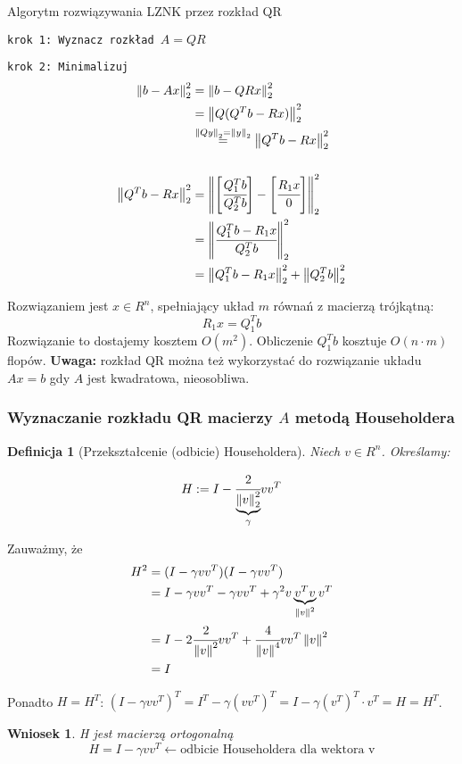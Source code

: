 \documentclass[hidelinks,a4paper,fleqn,oneside]{book}
\newcommand{\la}{\leftarrow}
\newcommand{\norm}[1]{\left\lVert#1\right\rVert}
\newtheorem{wniosek}{Wniosek}
\newtheorem{defi}{Definicja}
\begin{document}
Algorytm rozwiązywania LZNK przez rozkład QR


\texttt{krok 1: Wyznacz rozkład $A = QR$}

\texttt{krok 2: Minimalizuj }\begin{align*}
\norm{b - Ax}_2^2 &= \norm{b - QRx}^2_2 \\
& = \norm{Q(Q^Tb - Rx)}_2^2 \\
& \stackrel{\norm{Q y}_2 = \norm{y}_2}{=} \norm{Q^Tb - Rx}_2^2 \\
\\
 \norm{Q^Tb - Rx}_2^2 & = \norm{\left[\cfrac{Q_1^Tb}{Q_2^Tb}\right] - \left[\cfrac{R_1x}{0}\right]}_2^2 \\
 & = \norm{\cfrac{Q_1^Tb - R_1x}{Q_2^T b}}_2^2 \\
 & = \norm{Q_1^Tb - R_1x}_2^2 + \norm{Q_2^T b}_2^2
\end{align*}

Rozwiązaniem jest $x \in R^n$, spełniający układ $m$ równań z macierzą trójkątną:
\[
	R_1x = Q_1^Tb
\]
Rozwiązanie to dostajemy kosztem $O(m^2)$. Obliczenie $Q_1^Tb$ kosztuje $O(n \cdot m)$ flopów. \textbf{Uwaga: }rozkład QR można też wykorzystać do rozwiązanie układu $Ax=b$ gdy $A$ jest kwadratowa, nieosobliwa.

\subsubsection{Wyznaczanie rozkładu QR macierzy $A$ metodą Householdera}

\begin{defi}[Przekształcenie (odbicie) Householdera] 
Niech $v \in R^n$. Określamy:
	
	\[
		H := I - \cfrac{2}{\underbrace{\norm{v}_2^2}_{\gamma}}vv^T
	\]
\end{defi}

Zauważmy, że 
\begin{align*}
H^2 & = (I - \gamma vv^T)(I - \gamma vv^T) \\
& = I - \gamma vv^T - \gamma vv^T + \gamma^2v\underbrace{v^Tv}_{\norm{v}^2}v^T \\
& = I - 2 \cfrac{2}{\norm{v}^2}v v^T + \cfrac{4}{\norm{v}^4}  vv^T \norm{v}^2 \\
& = I
\end{align*}

Ponadto $H = H^T$: $(I - \gamma vv^T)^T = I^T - \gamma(vv^T)^T = I - \gamma(v^T)^T \cdot v^T = H = H^T$.

\begin{wniosek}H jest macierzą ortogonalną
	\[
		H = I - \gamma vv^T \la \textrm{odbicie Householdera dla wektora v}
	\]
\end{wniosek}
\end{document}
